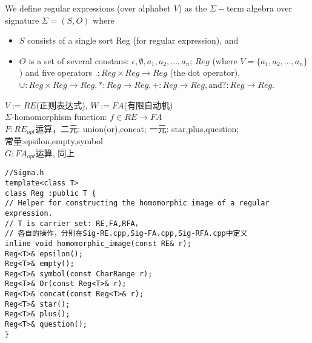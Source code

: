 \begin{definition}
	We define regular expressions (over alphabet $V$) as the $\Sigma -$term algebra over signature $\Sigma=(S,O)$ where
	\begin{itemize}
		\item $S$ consists of a single sort Reg (for regular expression), and
		\item $O$ is a set of several constans: $\epsilon,\emptyset,a_1,a_2,\dots,a_n$; $Reg$ (where $V=\{a_1,a_2,\dots,a_n\}$) and five operators $.:Reg\times Reg\to Reg$ (the dot operator), $\cup : Reg\times Reg\to Reg, \ast : Reg\to Reg,+:Reg\to Reg,\text{and} ?:Reg\to Reg$.
	\end{itemize}
\end{definition}

$V := RE$(正则表达式), $W := FA$(有限自动机)\\
$\Sigma$-homomorphism function: $f\in RE\to FA$ \\
$F:RE_{opt}$运算，二元: union(or),concat; 一元: star,plus,question;\\ 常量:epsilon,empty,symbol\\
$G:FA_{opt}$运算, 同上\\


\begin{lstlisting}
//Sigma.h
template<class T>
class Reg :public T {
// Helper for constructing the homomorphic image of a regular expression.
// T is carrier set: RE,FA,RFA，
// 各自的操作，分别在Sig-RE.cpp,Sig-FA.cpp,Sig-RFA.cpp中定义
inline void homomorphic_image(const RE& r);
Reg<T>& epsilon();
Reg<T>& empty();
Reg<T>& symbol(const CharRange r);
Reg<T>& Or(const Reg<T>& r);
Reg<T>& concat(const Reg<T>& r);
Reg<T>& star();
Reg<T>& plus();
Reg<T>& question();
}
\end{lstlisting}

